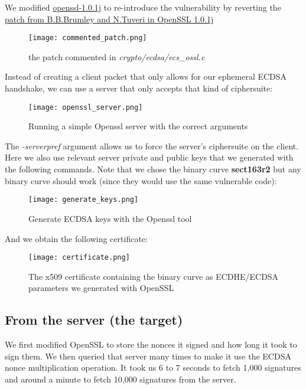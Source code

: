 \documentclass[a4paper,11pt]{article}
\begin{document}
We modified \href{ftp://ftp.openssl.org/source/old/1.0.1/openssl-1.0.1j.tar.gz}{openssl-1.0.1j} to re-introduce the vulnerability by reverting the \href{https://git.openssl.org/?p=openssl.git;a=blobdiff;f=CHANGES;h=1633d27975c91f122c4e9266b2c3cf4e56e8ffbf;hp=22749650b701d91cc43af24a226369116c2a46f8;hb=992bdde62d2eea57bb85935a0c1a0ef0ca59b3da;hpb=bbcf3a9b300bc8109bb306a53f6f3445ba02e8e9}{patch from B.B.Brumley and N.Tuveri in OpenSSL 1.0.1j}

\begin{figure}[H]
\texttt{[image: commented\_patch.png]}
\caption{the patch commented in \textit{crypto/ecdsa/ecs\_ossl.c}}
\end{figure}

Instead of creating a client packet that only allows for our ephemeral ECDSA handshake, we can use a server that only accepts that kind of ciphersuite:

\begin{figure}[H]
\texttt{[image: openssl\_server.png]}
\caption{Running a simple Openssl server with the correct arguments}
\end{figure}

The \textit{-serverpref} argument allows us to force the server's ciphersuite on the client. Here we also use relevant server private and public keys that we generated with the following commands. Note that we chose the binary curve \textbf{sect163r2} but any binary curve should work (since they would use the same vulnerable code):

\begin{figure}[H]
\texttt{[image: generate\_keys.png]}
\caption{Generate ECDSA keys with the Openssl tool}
\end{figure}

And we obtain the following certificate:

\begin{figure}[H]
\texttt{[image: certificate.png]}
\caption{The x509 certificate containing the binary curve as ECDHE/ECDSA parameters we generated with OpenSSL}
\end{figure}


\subsection{From the server (the target)}

We first modified OpenSSL to store the nonces it signed and how long it took to sign them. We then queried that server many times to make it use the ECDSA nonce multiplication operation. It took us 6 to 7 seconds to fetch 1,000 signatures and around a minute to fetch 10,000 signatures from the server.
\end{document}
